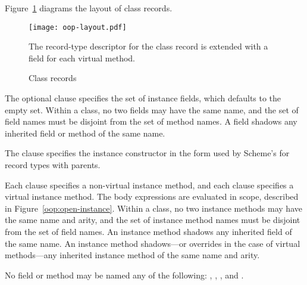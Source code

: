 Figure~\ref{oop:records} diagrams the layout of class records.

\begin{figure}[p]
  \begin{center}
    \texttt{[image: oop-layout.pdf]}
  \end{center}
  The record-type descriptor for the class record is extended with a field for each
  virtual method.
  \caption{\label{oop:records}Class records}
\end{figure}

The optional  clause specifies the set of instance fields, which defaults to
the empty set. Within a class, no two fields may have the same name, and the set of field
names must be disjoint from the set of method names. A field shadows any inherited field
or method of the same name.

The  clause specifies the instance constructor in the form used by Scheme's
 for record types with parents.

Each  clause specifies a non-virtual instance method, and each 
clause specifies a virtual instance method. The body expressions are evaluated in
 scope, described in Figure~\ref{oop:open-instance}. Within a class, no
two instance methods may have the same name and arity, and the set of instance method
names must be disjoint from the set of field names. An instance method shadows any
inherited field of the same name. An instance method shadows---or overrides in the case of
virtual methods---any inherited instance method of the same name and arity.

No field or method may be named any of the following: , ,
, and .

